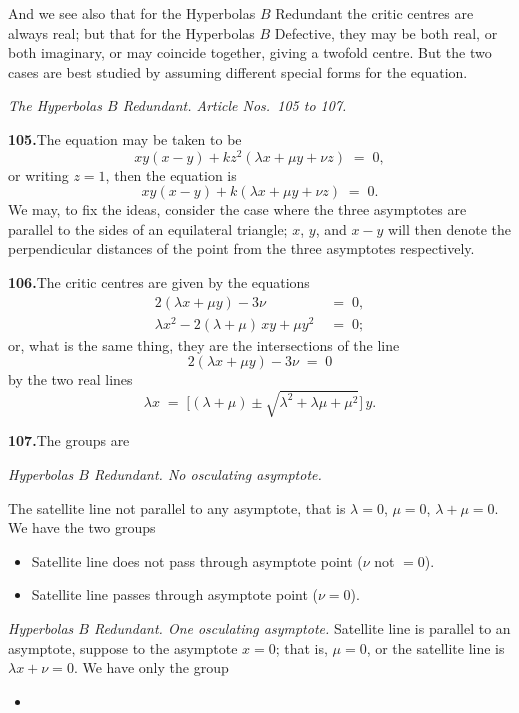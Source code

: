 \documentclass[11pt]{article}
\begin{document}
And we see also that for the Hyperbolas $B$ Redundant the critic centres are always real; but that for the Hyperbolas $B$ Defective, they may be both real, or both imaginary, or may coincide together, giving a twofold centre. But the two cases are best studied by assuming different special forms for the equation.

\bigskip
\noindent\textit{The Hyperbolas $B$ Redundant. Article Nos.~105 to 107.}

\medskip
\textbf{105.}\quad The equation may be taken to be
\[
x y(x - y) + k z^{2}(\lambda x + \mu y + \nu z) \;=\; 0,
\]
or writing $z = 1$, then the equation is
\[
x y(x - y) + k(\lambda x + \mu y + \nu z) \;=\; 0.
\]
We may, to fix the ideas, consider the case where the three asymptotes are parallel to the sides of an equilateral triangle; $x$, $y$, and $x - y$ will then denote the perpendicular distances of the point from the three asymptotes respectively.

\medskip
\textbf{106.}\quad The critic centres are given by the equations
\begin{align*}
2(\lambda x + \mu y) - 3 \nu &\;=\; 0,\\
\lambda x^{2} - 2(\lambda + \mu)\, x y + \mu y^{2} &\;=\; 0;
\end{align*}
or, what is the same thing, they are the intersections of the line
\[
2(\lambda x + \mu y) - 3 \nu \;=\; 0
\]
by the two real lines
\[
\lambda x \;=\; \bigl[(\lambda + \mu) \pm \sqrt{\lambda^{2} + \lambda \mu + \mu^{2}}\bigr]\, y.
\]

\medskip
\textbf{107.}\quad The groups are
\smallskip

\noindent\emph{Hyperbolas $B$ Redundant. No osculating asymptote.}

The satellite line not parallel to any asymptote, that is $\lambda = 0$, $\mu = 0$, $\lambda + \mu = 0$. We have the two groups
\begin{itemize}\itemsep0pt
\item[VII.] Satellite line does not pass through asymptote point ($\nu$ not $= 0$).
\item[VIII.] Satellite line passes through asymptote point ($\nu = 0$).
\end{itemize}

\noindent\emph{Hyperbolas $B$ Redundant. One osculating asymptote.} Satellite line is parallel to an asymptote, suppose to the asymptote $x = 0$; that is, $\mu = 0$, or the satellite line is $\lambda x + \nu = 0$. We have only the group
\begin{itemize}\itemsep0pt
\item[XV.]
\end{itemize}
\end{document}
